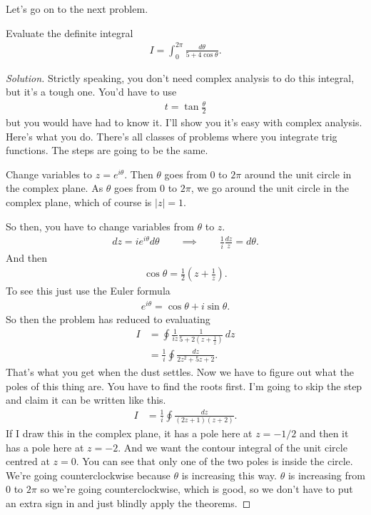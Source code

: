 Let's go on to the next problem.
\begin{example}
    Evaluate the definite integral
    \begin{align}
        I = \int_{0}^{2\pi} \frac{d\theta}{5 + 4\cos\theta}.
    \end{align}
\end{example}
\begin{proof}[Solution]
    Strictly speaking,
    you don't need complex analysis to do this integral,
    but it's a tough one.
    You'd have to use
    \begin{align}
        t = \tan\frac{\theta}{2}
    \end{align}
    but you would have had to know it.
    I'll show you it's easy with complex analysis.
    Here's what you do.
    There's all classes of problems where you integrate trig functions.
    The steps are going to be the same.

    Change variables to $z=e^{i\theta}$.
    Then $\theta$ goes from $0$ to $2\pi$
    around the unit circle in the complex plane.
    As $\theta$ goes from $0$ to $2\pi$,
    we go around the unit circle in the complex plane,
    which of course is $|z|=1$.

    So then, you have to change variables from $\theta$ to $z$.
    \begin{align}
        dz = i e^{i\theta} d\theta\qquad
        \implies\qquad
        \frac{1}{i} \frac{dz}{z} = d\theta.
    \end{align}
    And then
    \begin{align}
        \cos\theta = \frac{1}{2}\left(
            z + \frac{1}{z}
        \right).
    \end{align}
    To see this
    just use the Euler formula
    \begin{align}
        e^{i\theta} = \cos\theta + i\sin\theta.
    \end{align}
    So then the problem has reduced to evaluating
    \begin{align}
        I &=
        \oint \frac{1}{iz}
        \frac{1}{5 + 2\left( z + \frac{1}{z} \right)}\,dz\\
        &= \frac{1}{i}\oint \frac{dz}{2z^2 + 5z + 2}.
    \end{align}
    That's what you get when the dust settles.
    Now we have to figure out what the poles of this thing are.
    You have to find the roots first.
    I'm going to skip the step and claim it can be written like this.
    \begin{align}
        I &=
        \frac{1}{i}
        \oint
        \frac{dz}{(2z + 1)(z + 2)}.
    \end{align}
    If I draw this in the complex plane,
    it has a pole here at $z=-1/2$ and then it has a pole here at $z=-2$.
    And we want the contour integral of the unit circle
    centred at $z=0$.
    You can see that only one of the two poles is inside the circle.
    We're going counterclockwise because $\theta$ is increasing this way.
    $\theta$ is increasing from $0$ to $2\pi$ so we're going counterclockwise,
    which is good,
    so we don't have to put an extra sign in
    and just blindly apply the theorems.


\end{proof}
